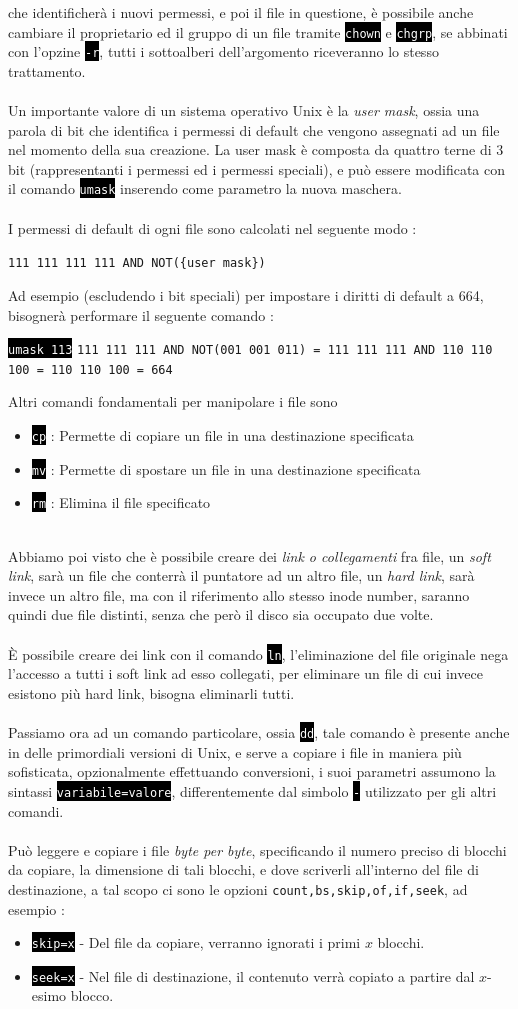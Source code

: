 \documentclass[12pt, letterpaper]{article}
\newcommand{\code}[1]{\colorbox{light-gray}{\texttt{#1}}}
\newcommand{\shelll}[1]{\colorbox{black}{\textcolor{white}{\texttt{#1}}}}
\newcommand{\acc}{\\\hphantom{}\\}
\begin{document}
che identificherà i nuovi permessi, e poi il file in questione, è possibile anche cambiare il proprietario ed il gruppo di un 
file tramite \shelll{chown} e \shelll{chgrp}, se abbinati con l'opzine \shelll{-r}, tutti i sottoalberi dell'argomento 
riceveranno lo stesso trattamento.\acc Un importante valore di un sistema operativo Unix è la  \textit{user mask}, ossia 
una parola di bit che identifica i permessi di default che vengono assegnati ad un file nel momento della sua creazione.
La user mask è composta da quattro terne di 3 bit (rappresentanti i permessi ed i permessi speciali), e può essere modificata 
con il comando \shelll{umask} inserendo come parametro la nuova maschera.\acc 
I permessi di default di ogni file sono calcolati nel seguente modo : \begin{center}
    \code{111 111 111 111 AND NOT(\{user mask\})}
\end{center}
Ad esempio (escludendo i bit speciali) per impostare i diritti di default a 664, bisognerà performare il seguente comando : \begin{center}
    \shelll{umask 113}  \code{111 111 111 AND NOT(001 001 011) = 111 111 111 AND 110 110 100 = 110 110 100 = 664}
\end{center}
Altri comandi fondamentali per manipolare i file sono\begin{itemize} \item \shelll{cp} : Permette di copiare un file in una destinazione specificata
    \item \shelll{mv} : Permette di spostare un file in una destinazione specificata \item\shelll{rm} : Elimina il file specificato\acc 
\end{itemize}
Abbiamo poi visto che è possibile creare dei \textit{link o collegamenti} fra file, un \textit{soft link}, sarà un file che conterrà 
il puntatore ad un altro file, un \textit{hard link}, sarà invece un altro file, ma con il riferimento allo stesso inode number,
saranno quindi due file distinti, senza che però il disco sia occupato due volte.\acc 
È possibile creare dei link con il comando \shelll{ln}, l'eliminazione del file originale nega l'accesso a tutti 
i soft link ad esso collegati, per eliminare un file di cui invece esistono più hard link, bisogna eliminarli tutti.\acc 
Passiamo ora ad un comando particolare, ossia \shelll{dd}, tale comando è presente anche in delle primordiali versioni di Unix, e 
serve a copiare i file in maniera più sofisticata, opzionalmente effettuando conversioni, i suoi parametri assumono la 
sintassi \shelll{variabile=valore}, differentemente dal simbolo \shelll{-} utilizzato per gli altri comandi.\acc 
Può leggere e copiare i file \textit{byte per byte}, specificando il numero preciso di blocchi da copiare, la dimensione 
di tali blocchi, e 
dove scriverli all'interno del file di destinazione, a tal scopo ci sono le opzioni \code{count,bs,skip,of,if,seek}, ad esempio : \begin{itemize}
    \item \shelll{skip=x} - Del file da copiare, verranno ignorati i primi $x$ blocchi.
    \item \shelll{seek=x} - Nel file di destinazione, il contenuto verrà copiato a partire dal $x$-esimo blocco. 
\end{itemize}
\end{document}
